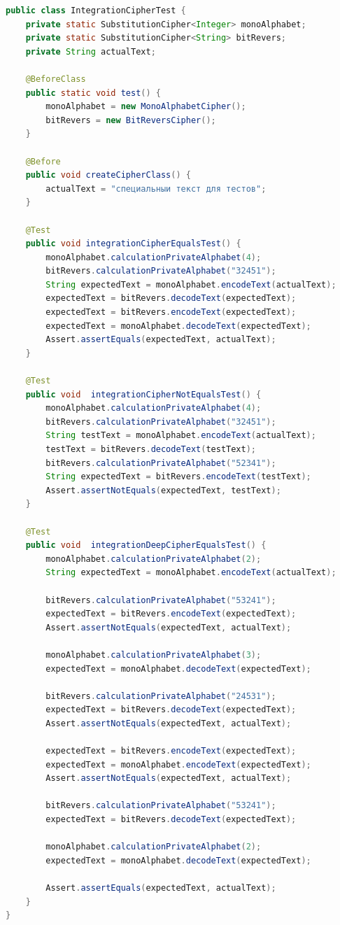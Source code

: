 \documentclass[a4paper,12pt]{article}
\begin{document}
\begin{lstlisting}[language=java, caption=класс IntegrationCipherTest, label=listing_cipher:test_cipher_methods]
public class IntegrationCipherTest {
    private static SubstitutionCipher<Integer> monoAlphabet;
    private static SubstitutionCipher<String> bitRevers;
    private String actualText;

    @BeforeClass
    public static void test() {
        monoAlphabet = new MonoAlphabetCipher();
        bitRevers = new BitReversCipher();
    }

    @Before
    public void createCipherClass() {
        actualText = "специальныи текст для тестов";
    }

    @Test
    public void integrationCipherEqualsTest() {
        monoAlphabet.calculationPrivateAlphabet(4);
        bitRevers.calculationPrivateAlphabet("32451");
        String expectedText = monoAlphabet.encodeText(actualText);
        expectedText = bitRevers.decodeText(expectedText);
        expectedText = bitRevers.encodeText(expectedText);
        expectedText = monoAlphabet.decodeText(expectedText);
        Assert.assertEquals(expectedText, actualText);
    }

    @Test
    public void  integrationCipherNotEqualsTest() {
        monoAlphabet.calculationPrivateAlphabet(4);
        bitRevers.calculationPrivateAlphabet("32451");
        String testText = monoAlphabet.encodeText(actualText);
        testText = bitRevers.decodeText(testText);
        bitRevers.calculationPrivateAlphabet("52341");
        String expectedText = bitRevers.encodeText(testText);
        Assert.assertNotEquals(expectedText, testText);
    }

    @Test
    public void  integrationDeepCipherEqualsTest() {
        monoAlphabet.calculationPrivateAlphabet(2);
        String expectedText = monoAlphabet.encodeText(actualText);

        bitRevers.calculationPrivateAlphabet("53241");
        expectedText = bitRevers.encodeText(expectedText);
        Assert.assertNotEquals(expectedText, actualText);

        monoAlphabet.calculationPrivateAlphabet(3);
        expectedText = monoAlphabet.decodeText(expectedText);

        bitRevers.calculationPrivateAlphabet("24531");
        expectedText = bitRevers.decodeText(expectedText);
        Assert.assertNotEquals(expectedText, actualText);

        expectedText = bitRevers.encodeText(expectedText);
        expectedText = monoAlphabet.encodeText(expectedText);
        Assert.assertNotEquals(expectedText, actualText);

        bitRevers.calculationPrivateAlphabet("53241");
        expectedText = bitRevers.decodeText(expectedText);

        monoAlphabet.calculationPrivateAlphabet(2);
        expectedText = monoAlphabet.decodeText(expectedText);

        Assert.assertEquals(expectedText, actualText);
    }
}
\end{lstlisting}
\end{document}
